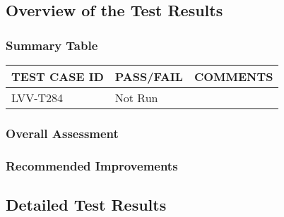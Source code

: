 \documentclass[DM,lsstdraft,STR,toc]{lsstdoc}
\begin{document}
\subsection{Overview of the Test Results}
\label{sect:overview}

\subsubsection{Summary Table}
\label{sect:summarytable}


\begin{longtable} {|p{}|p{}|p{}|}
\hline
{\bf TEST CASE ID} & {\bf PASS/FAIL} & {\bf COMMENTS} \\\hline
LVV-T284 & Not Run & \\\hline
\end{longtable}

\subsubsection{Overall Assessment}
\label{sect:overallassessment}


\subsubsection{Recommended Improvements}
\label{sect:recommendations}

\subsection{Detailed Test Results}
\label{sect:detailedtestresults}
\end{document}
